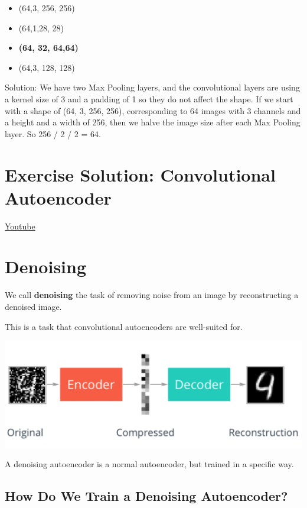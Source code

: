 \begin{itemize}
    \item (64,3, 256, 256)
    \item (64,1,28, 28)
    \item \textbf{(64, 32, 64,64)}
    \item (64,3, 128, 128)
\end{itemize}
Solution: We have two Max Pooling layers, and the convolutional layers are using a kernel size of 3 and a padding of 1 so they do not affect the shape. If we start with a shape of (64, 3, 256, 256), corresponding to 64 images with 3 channels and a height and a width of 256, then we halve the image size after each Max Pooling layer. So 256 / 2 / 2 = 64.


\section{Exercise Solution: Convolutional Autoencoder}
\href{https://www.youtube.com/watch?v=GE7FMPzzBSs&t=8s&ab_channel=Udacity}{Youtube}


\section{Denoising}

We call \textbf{denoising} the task of removing noise from an image by reconstructing a denoised image.\newline

This is a task that convolutional autoencoders are well-suited for.

\includegraphics[width=1\linewidth]{img//cnn//autoencoders/autoencoder-denoise.jpeg}

A denoising autoencoder is a normal autoencoder, but trained in a specific way.

\subsection{How Do We Train a Denoising Autoencoder?}

